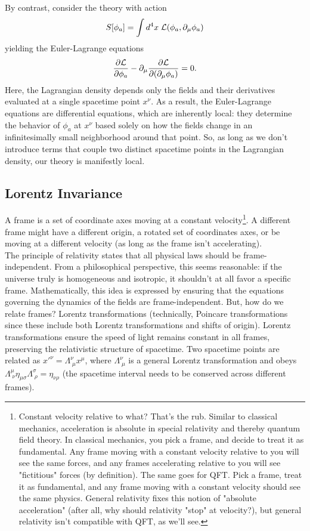 \noindent By contrast, consider the theory with action
\[
    S[\phi_a] = \int d^4x\; \mathcal{L}(\phi_a, \partial_\mu\phi_a)
\]
yielding the Euler-Lagrange equations
\[
    \frac{\partial\mathcal{L}}{\partial\phi_a} - \partial_\mu\frac{\partial\mathcal{L}}{\partial(\partial_\mu\phi_a)}=0.
\]
Here, the Lagrangian density depends only the fields and their derivatives evaluated at a single spacetime point $x^\nu$. As a result, the Euler-Lagrange equations are differential equations, which are inherently local: they determine the behavior of $\phi_a$ at $x^\nu$ based solely on how the fields change in an infinitesimally small neighborhood around that point. So, as long as we don't introduce terms that couple two distinct spacetime points in the Lagrangian density, our theory is manifestly local.

\subsection{Lorentz Invariance}
A frame is a set of coordinate axes moving at a constant velocity\footnote[2]{Constant velocity relative to what? That's the rub. Similar to classical mechanics, acceleration is absolute in special relativity and thereby quantum field theory. In classical mechanics, you pick a frame, and decide to treat it as fundamental. Any frame moving with a constant velocity relative to you will see the same forces, and any frames accelerating relative to you will see "fictitious" forces (by definition). The same goes for QFT. Pick a frame, treat it as fundamental, and any frame moving with a constant velocity should see the same physics. General relativity fixes this notion of "absolute acceleration" (after all, why should relativity "stop" at velocity?), but general relativity isn't compatible with QFT, as we'll see.}. A different frame might have a different origin, a rotated set of coordinates axes, or be moving at a different velocity (as long as the frame isn't accelerating).\\

\noindent The principle of relativity states that all physical laws should be frame-independent. From a philosophical perspective, this seems reasonable: if the universe truly is homogeneous and isotropic, it shouldn't at all favor a specific frame. Mathematically, this idea is expressed by ensuring that the equations governing the dynamics of the fields are frame-independent. But, how do we relate frames? Lorentz transformations (technically, Poincare transformations since these include both Lorentz transformations and shifts of origin). Lorentz transformations ensure the speed of light remains constant in all frames, preserving the relativistic structure of spacetime. Two spacetime points are related as $x'^\nu=\Lambda_{\;\mu}^\nu x^\mu$, where $\Lambda_{\;\mu}^\nu$ is a general Lorentz transformation and obeys $\Lambda_{\;\nu}^\mu\eta_{\mu\sigma}\Lambda^\sigma_{\;\rho}=\eta_{\nu\rho}$ (the spacetime interval needs to be conserved across different frames).\\

